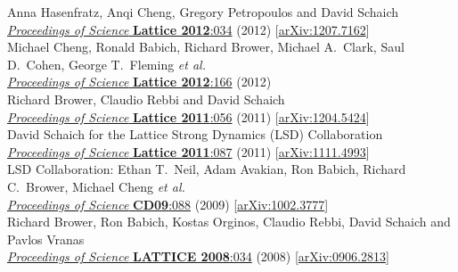 \begin{spacelist}
\begin{revnumerate}
      Anna Hasenfratz, Anqi Cheng, Gregory Petropoulos and David Schaich \\
      \href{https://doi.org/10.22323/1.164.0034}{\textit{Proceedings of Science} \textbf{Lattice 2012}:034} (2012) [\href{http://arxiv.org/abs/1207.7162}{arXiv:1207.7162}]
    \pagebreakitem
       \\
      Michael Cheng, Ronald Babich, Richard Brower, Michael A.~Clark, Saul D.~Cohen, George T.~Fleming \textit{et al.} \\
      \href{https://doi.org/10.22323/1.164.0166}{\textit{Proceedings of Science} \textbf{Lattice 2012}:166} (2012)
    \pagebreakitem
       \\
      Richard Brower, Claudio Rebbi and David Schaich \\
      \href{https://doi.org/10.22323/1.139.0056}{\textit{Proceedings of Science} \textbf{Lattice 2011}:056} (2011) [\href{http://arxiv.org/abs/1204.5424}{arXiv:1204.5424}]
    \pagebreakitem
       \\
      David Schaich for the Lattice Strong Dynamics (LSD) Collaboration \\
      \href{https://doi.org/10.22323/1.139.0087}{\textit{Proceedings of Science} \textbf{Lattice 2011}:087} (2011) [\href{http://arxiv.org/abs/1111.4993}{arXiv:1111.4993}]
    \pagebreakitem
       \\
      LSD Collaboration: Ethan T.~Neil, Adam Avakian, Ron Babich, Richard C.~Brower, Michael Cheng \textit{et al.} \\ %
      \href{https://doi.org/10.22323/1.086.0088}{\textit{Proceedings of Science} \textbf{CD09}:088} (2009) [\href{http://arxiv.org/abs/1002.3777}{arXiv:1002.3777}]
    \pagebreakitem
       \\
      Richard Brower, Ron Babich, Kostas Orginos, Claudio Rebbi, David Schaich and Pavlos Vranas \\
      \href{https://doi.org/10.22323/1.066.0034}{\textit{Proceedings of Science} \textbf{LATTICE 2008}:034} (2008) [\href{http://arxiv.org/abs/0906.2813}{arXiv:0906.2813}]
  \end{revnumerate}

\end{spacelist}
